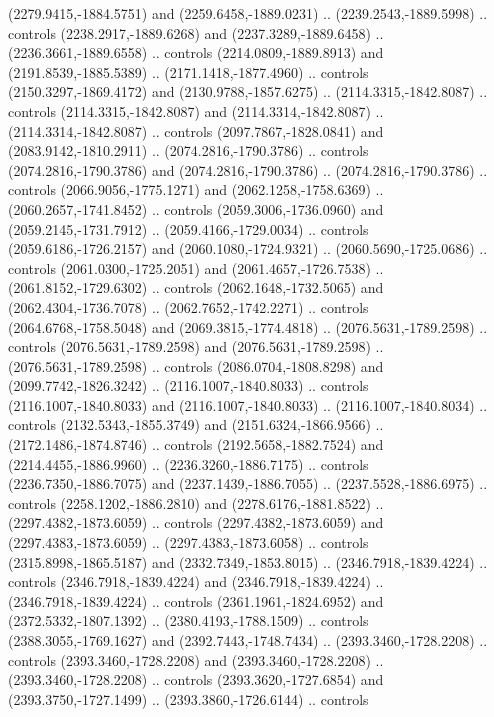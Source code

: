 \begin{scope}[shift={(-24.70323,-217.37029)}]
\begin{scope}[shift={(-1886.1309,2235.3934)}]
\begin{scope}[cm={{1.35882,0.0,0.0,1.35882,(-799.33173,617.61172)}}]
        (2279.9415,-1884.5751) and (2259.6458,-1889.0231) .. (2239.2543,-1889.5998) ..
        controls (2238.2917,-1889.6268) and (2237.3289,-1889.6458) ..
        (2236.3661,-1889.6558) .. controls (2214.0809,-1889.8913) and
        (2191.8539,-1885.5389) .. (2171.1418,-1877.4960) .. controls
        (2150.3297,-1869.4172) and (2130.9788,-1857.6275) .. (2114.3315,-1842.8087) ..
        controls (2114.3315,-1842.8087) and (2114.3314,-1842.8087) ..
        (2114.3314,-1842.8087) .. controls (2097.7867,-1828.0841) and
        (2083.9142,-1810.2911) .. (2074.2816,-1790.3786) .. controls
        (2074.2816,-1790.3786) and (2074.2816,-1790.3786) .. (2074.2816,-1790.3786) ..
        controls (2066.9056,-1775.1271) and (2062.1258,-1758.6369) ..
        (2060.2657,-1741.8452) .. controls (2059.3006,-1736.0960) and
        (2059.2145,-1731.7912) .. (2059.4166,-1729.0034) .. controls
        (2059.6186,-1726.2157) and (2060.1080,-1724.9321) .. (2060.5690,-1725.0686) ..
        controls (2061.0300,-1725.2051) and (2061.4657,-1726.7538) ..
        (2061.8152,-1729.6302) .. controls (2062.1648,-1732.5065) and
        (2062.4304,-1736.7078) .. (2062.7652,-1742.2271) .. controls
        (2064.6768,-1758.5048) and (2069.3815,-1774.4818) .. (2076.5631,-1789.2598) ..
        controls (2076.5631,-1789.2598) and (2076.5631,-1789.2598) ..
        (2076.5631,-1789.2598) .. controls (2086.0704,-1808.8298) and
        (2099.7742,-1826.3242) .. (2116.1007,-1840.8033) .. controls
        (2116.1007,-1840.8033) and (2116.1007,-1840.8033) .. (2116.1007,-1840.8034) ..
        controls (2132.5343,-1855.3749) and (2151.6324,-1866.9566) ..
        (2172.1486,-1874.8746) .. controls (2192.5658,-1882.7524) and
        (2214.4455,-1886.9960) .. (2236.3260,-1886.7175) .. controls
        (2236.7350,-1886.7075) and (2237.1439,-1886.7055) .. (2237.5528,-1886.6975) ..
        controls (2258.1202,-1886.2810) and (2278.6176,-1881.8522) ..
        (2297.4382,-1873.6059) .. controls (2297.4382,-1873.6059) and
        (2297.4383,-1873.6059) .. (2297.4383,-1873.6058) .. controls
        (2315.8998,-1865.5187) and (2332.7349,-1853.8015) .. (2346.7918,-1839.4224) ..
        controls (2346.7918,-1839.4224) and (2346.7918,-1839.4224) ..
        (2346.7918,-1839.4224) .. controls (2361.1961,-1824.6952) and
        (2372.5332,-1807.1392) .. (2380.4193,-1788.1509) .. controls
        (2388.3055,-1769.1627) and (2392.7443,-1748.7434) .. (2393.3460,-1728.2208) ..
        controls (2393.3460,-1728.2208) and (2393.3460,-1728.2208) ..
        (2393.3460,-1728.2208) .. controls (2393.3620,-1727.6854) and
        (2393.3750,-1727.1499) .. (2393.3860,-1726.6144) .. controls

\end{scope}
\end{scope}
\end{scope}
